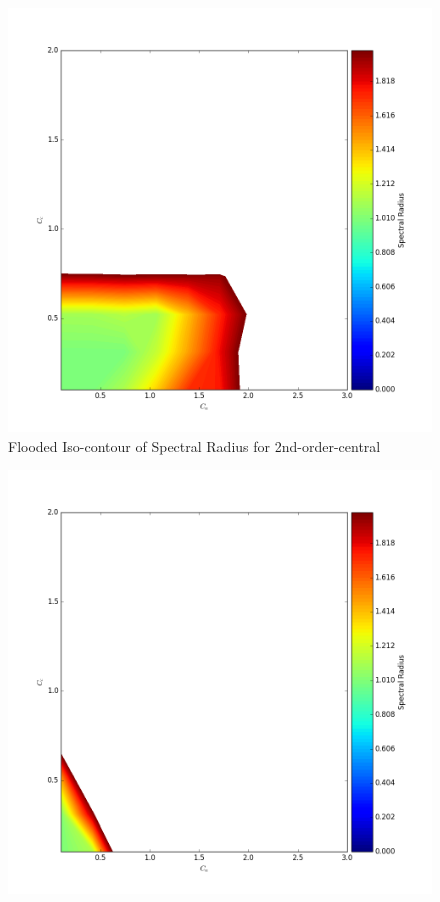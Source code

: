 \documentclass[12pt]{article}
\newenvironment{problem}[2][Problem]{\begin{trivlist}
\item[\hskip \labelsep {\bfseries #1}\hskip \labelsep {\bfseries #2.}]}{\end{trivlist}}
\begin{document}
\begin{problem}{2}
\begin{figure}[H]
\centering
  \includegraphics[scale=0.35]{p2e_contours_c2nd.png}
 \caption{Flooded Iso-contour of Spectral Radius for 2nd-order-central}
\label{label}
\end{figure}
\begin{figure}[H]
\centering
  \includegraphics[scale=0.35]{p2e_contours_u2nd.png}

\end{figure}
\end{problem}
\end{document}
